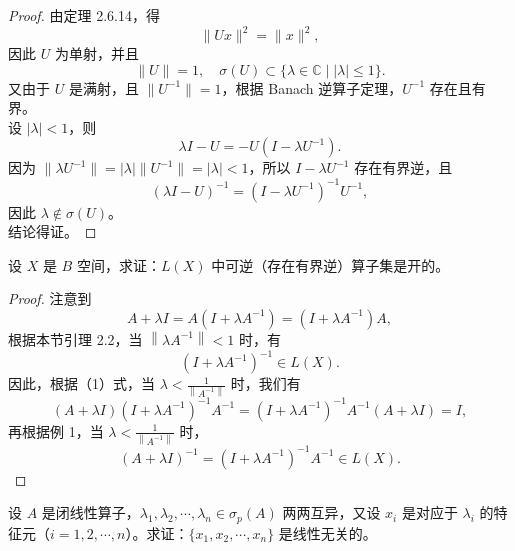 \documentclass[lang=cn,newtx,10pt,scheme=chinese,thmcnt=chapter]{elegantbook}
\begin{document}
\begin{proof}
由定理 2.6.14，得
\[
\|U x\|^2 = \|x\|^2,
\]
因此 \( U \) 为单射，并且
\[
\|U\| = 1, \quad \sigma(U) \subset \{\lambda \in \mathbb{C} \mid |\lambda| \leqslant 1\}.
\]
又由于 \( U \) 是满射，且 \( \|U^{-1}\| = 1 \)，根据 Banach 逆算子定理，\( U^{-1} \) 存在且有界。\\
设 \( |\lambda| < 1 \)，则
\[
\lambda I - U = -U \left( I - \lambda U^{-1} \right).
\]
因为 \( \| \lambda U^{-1} \| = |\lambda| \| U^{-1} \| = |\lambda| < 1 \)，所以 \( I - \lambda U^{-1} \) 存在有界逆，且
\[
(\lambda I - U)^{-1} = \left( I - \lambda U^{-1} \right)^{-1} U^{-1},
\]
因此 \( \lambda \notin \sigma(U) \)。\\
结论得证。
\end{proof}
\begin{problem}
设 $X$ 是 $B$ 空间，求证：$L(X)$ 中可逆（存在有界逆）算子集是开的。
\end{problem}
\begin{proof}
注意到
\begin{equation*}
A + \lambda I = A \left(I + \lambda A^{-1}\right) = \left(I + \lambda A^{-1}\right) A,
\end{equation*}
根据本节引理 2.2，当 $\left\|\lambda A^{-1}\right\| < 1$ 时，有
\[
\left(I + \lambda A^{-1}\right)^{-1} \in L(X).
\]
因此，根据（1）式，当 $\lambda < \frac{1}{\left\|A^{-1}\right\|}$ 时，我们有
\begin{equation*}
(A + \lambda I)\left(I + \lambda A^{-1}\right)^{-1} A^{-1} = \left(I + \lambda A^{-1}\right)^{-1} A^{-1}(A + \lambda I) = I,
\end{equation*}
再根据例 1，当 $\lambda < \frac{1}{\left\|A^{-1}\right\|}$ 时，
\begin{equation*}
(A + \lambda I)^{-1} = \left(I + \lambda A^{-1}\right)^{-1} A^{-1} \in L(X).
\end{equation*}
\end{proof}
\begin{problem}
设 $A$ 是闭线性算子，$\lambda_1, \lambda_2, \cdots, \lambda_n \in \sigma_p(A)$ 两两互异，又设 $x_i$ 是对应于 $\lambda_i$ 的特征元（$i = 1, 2, \cdots, n$）。求证：$\{x_1, x_2, \cdots, x_n\}$ 是线性无关的。
\end{problem}
\end{document}
